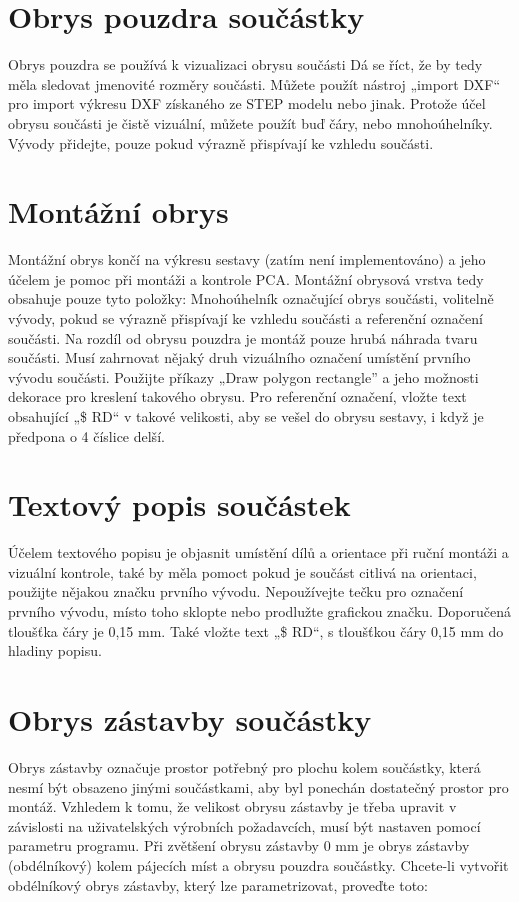 \documentclass[letterpaper,10pt,czech]{sphinxmanual}
\begin{document}
\section{Obrys pouzdra součástky}
\label{\detokenize{create-package:obrys-pouzdra-soucastky}}
Obrys pouzdra se používá k vizualizaci obrysu součásti
Dá se říct, že by tedy měla sledovat jmenovité rozměry součásti. Můžete použít nástroj „import DXF“ pro import výkresu DXF získaného ze STEP modelu nebo jinak. Protože účel obrysu součásti je čistě
vizuální, můžete použít buď čáry, nebo mnohoúhelníky. Vývody přidejte, pouze pokud
výrazně přispívají ke vzhledu součásti.


\section{Montážní obrys}
\label{\detokenize{create-package:montazni-obrys}}
Montážní obrys končí na výkresu sestavy (zatím není implementováno) a jeho účelem je pomoc při montáži a kontrole PCA. Montážní obrysová vrstva tedy obsahuje pouze tyto položky: Mnohoúhelník označující obrys součásti, volitelně vývody, pokud se výrazně přispívají ke vzhledu součásti a referenční označení součásti. Na rozdíl od obrysu pouzdra je montáž pouze hrubá náhrada tvaru součásti. Musí zahrnovat nějaký druh vizuálního označení umístění prvního vývodu součásti. Použijte příkazy  „Draw polygon rectangle” a jeho možnosti dekorace pro kreslení takového obrysu. Pro referenční označení, vložte text obsahující „\$ RD“ v takové velikosti, aby se vešel do obrysu sestavy, i když je předpona o 4 číslice delší.


\section{Textový popis součástek}
\label{\detokenize{create-package:textovy-popis-soucastek}}
Účelem textového popisu je objasnit umístění dílů a orientace při ruční montáži a vizuální kontrole, také by měla pomoct pokud je součást citlivá na orientaci, použijte nějakou značku prvního vývodu. Nepoužívejte tečku pro označení prvního vývodu, místo toho sklopte nebo prodlužte grafickou značku. Doporučená tloušťka čáry je 0,15 mm. Také vložte text „\$ RD“, s tloušťkou čáry 0,15 mm do hladiny popisu.


\section{Obrys zástavby součástky}
\label{\detokenize{create-package:obrys-zastavby-soucastky}}
Obrys zástavby označuje prostor potřebný pro plochu kolem součástky, která nesmí být obsazeno jinými součástkami, aby byl ponechán dostatečný prostor pro montáž. Vzhledem k tomu, že velikost obrysu zástavby je třeba upravit v závislosti na uživatelských výrobních požadavcích, musí být nastaven pomocí parametru
programu. Při zvětšení obrysu zástavby 0 mm je obrys zástavby (obdélníkový) kolem pájecích míst a obrysu pouzdra součástky. Chcete-li vytvořit obdélníkový obrys zástavby, který lze parametrizovat, proveďte toto:
\end{document}
